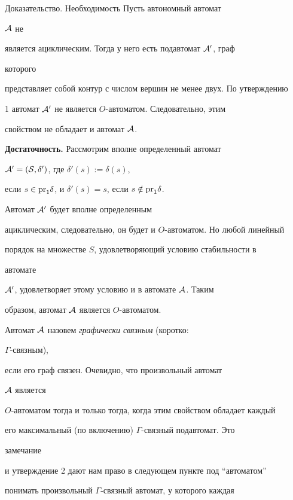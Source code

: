 \begin{pf*}{Доказательство. Необходимость} Пусть автономный автомат


$\cal A$ не


является ациклическим. Тогда у него есть подавтомат $\cal A'$, граф


которого


представляет собой контур с числом вершин не менее двух. По утверждению


1 автомат $\cal A'$ не является $O$-автоматом. Следовательно, этим


свойством не обладает и автомат $\cal A$.


\medskip





{\bf Достаточность.} Рассмотрим вполне определенный автомат


$\cal A'=(S,\delta')$, где $\delta'(s):=\delta(s)$,


если $s\in\mathrm{pr}_1\delta$, и $\delta'(s)=s$, если $s\notin\mathrm{pr}_1\delta$.


Автомат $\cal A'$ будет вполне определенным


ациклическим, следовательно, он будет и $O$-автоматом. Но любой линейный


порядок на множестве $S$, удовлетворяющий условию стабильности в


автомате


$\cal A'$, удовлетворяет этому условию и в автомате $\cal A$. Таким


образом, автомат $\cal A$ является $O$-автоматом.


\end{pf*}





Автомат $\cal A$ назовем {\em графически связным} (коротко:


$\Gamma$-связным),


если его граф связен. Очевидно, что произвольный автомат


$\cal A$ является


$O$-автоматом тогда и только тогда, когда этим свойством обладает каждый


его максимальный (по включению) $\Gamma$-связный подавтомат. Это


замечание


и утверждение 2 дают нам право в следующем пункте под ``автоматом''


понимать произвольный $\Gamma$-связный автомат, у которого каждая


